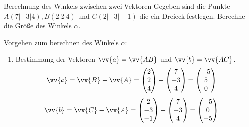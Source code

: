 \begin{bsp}{Berechnung des Winkels zwischen zwei Vektoren}{}
Gegeben sind die Punkte $A(7|-3|4), B(2|2|4)$ und $C(2|-3|-1)$ die ein Dreieck festlegen. Berechne die Größe des Winkels $\alpha$.
\begin{center}
\end{center}
Vorgehen zum berechnen des Winkels $\alpha$:
\begin{enumerate}
    \item Bestimmung der Vektoren $\vv{a} = \vv{AB}$ und $\vv{b} = \vv{AC}$.
    \begin{equation*}
        \begin{split}
            \vv{a} &= \vv{B} - \vv{A} = \begin{pmatrix} 2 \\2 \\4\end{pmatrix} -\begin{pmatrix} 7 \\-3 \\4\end{pmatrix} = \begin{pmatrix} -5 \\5\\0\end{pmatrix} 
            \end{split}
            \end{equation*}
    \begin{equation*}
        \begin{split}
            \vv{b} &= \vv{C} - \vv{A} = \begin{pmatrix} 2 \\-3 \\-1\end{pmatrix} -\begin{pmatrix} 7 \\-3 \\4\end{pmatrix} = \begin{pmatrix} -5 \\0\\-5\end{pmatrix} 
            \end{split}
            \end{equation*}
                

\end{enumerate}
\end{bsp}

